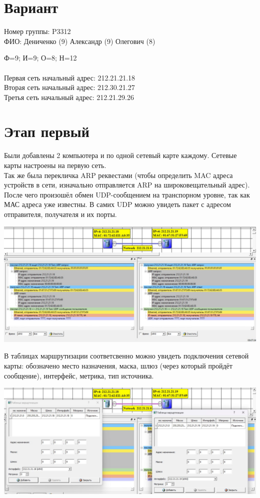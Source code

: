 \documentclass{article}
\begin{document}
\section*{Вариант}

Номер группы: P3312
\\
ФИО: Дениченко (9) Александр (9) Олегович (8)

Ф=9; И=9; О=8; Н=12
\\ \\
Первая сеть начальный адрес: 212.21.21.18
\\
Вторая сеть начальный адрес: 212.30.21.27
\\
Третья сеть начальный адрес: 212.21.29.26



\section{Этап первый}
Были добавлены 2 компьютера и по одной сетевый карте каждому.
Сетевые карты настроены на первую сеть.
\\
Так же была перекличка ARP реквестами (чтобы определить MAC адреса устройств в сети, изначально отправляется ARP на широковещательный адрес). 
После чего произошёл обмен UDP-сообщением на транспорном уровне, так как МАС адреса уже известны.
В самих UDP можно увидеть пакет с адресом отправителя, получателя и их порты.
\begin{center}
    \includegraphics[width=.9\textwidth]{1}
\end{center}

В таблицах маршрутизации соответсвенно можно увидеть подключения сетевой карты: обозначено место назначения, маска, шлюз (через который пройдёт сообщение), интерфейс, метрика, тип источника.

\begin{center}
    \includegraphics[width=.9\textwidth]{2}
\end{center}
\end{document}
